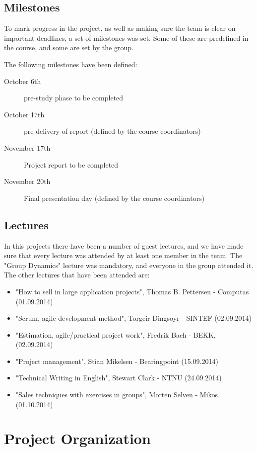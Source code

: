 \documentclass[11pt,a4paper,titlepage,oneside]{report}
\begin{document}
\subsection{Milestones}
To mark progress in the project, as well as making sure the team is clear on important deadlines, a set of milestones was set. Some of these are predefined in the course, and some are set by the group. 

The following milestones have been defined:
\begin{description}
\item[October 6th] \Gls{pre-study} phase to be completed
\item[October 17th] \Gls{pre-delivery} of report (defined by the course coordinators)
\item[November 17th] Project report to be completed
\item[November 20th] Final presentation day (defined by the course coordinators)
\end{description}

\subsection{Lectures}
In this projects there have been a number of guest lectures, and we have made sure that every lecture was attended by at least one member in the team.
The "Group Dynamics" lecture was mandatory, and everyone in the group attended it.
The other lectures that have been attended are:
\begin{itemize}
\item "How to sell in large application projects", Thomas B. Pettersen - Computas (01.09.2014)
\item "Scrum, agile development method", Torgeir Dingsoyr - SINTEF (02.09.2014)
\item "Estimation, agile/practical project work", Fredrik Bach - BEKK, (02.09.2014)
\item "Project management", Stian Mikelsen - Bearingpoint (15.09.2014)
\item "Technical Writing in English", Stewart Clark - \gls{NTNU} (24.09.2014)
\item "Sales techniques with exercises in groups", Morten Selven - Mikos (01.10.2014)
\end{itemize}

\section{Project Organization}
\end{document}
